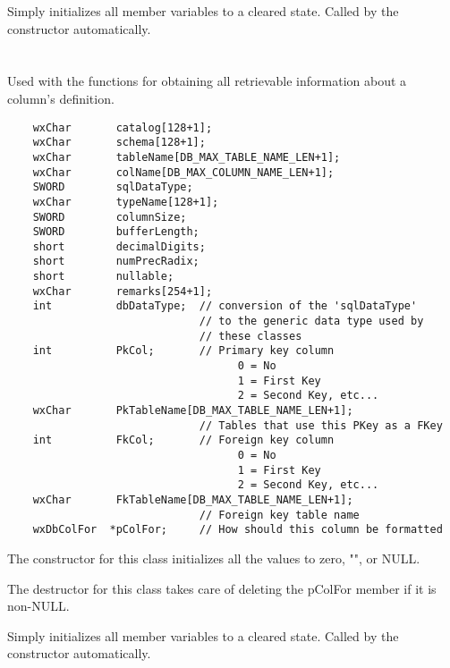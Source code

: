 \label{wxdbcolforinitialize}

Simply initializes all member variables to a cleared state.  Called by 
the constructor automatically.


\section{}\label{wxdbcolinf}

Used with the  functions for obtaining all retrievable information about a column's definition.

\begin{verbatim}
    wxChar       catalog[128+1];
    wxChar       schema[128+1];
    wxChar       tableName[DB_MAX_TABLE_NAME_LEN+1];
    wxChar       colName[DB_MAX_COLUMN_NAME_LEN+1];
    SWORD        sqlDataType;
    wxChar       typeName[128+1];
    SWORD        columnSize;
    SWORD        bufferLength;
    short        decimalDigits;
    short        numPrecRadix;
    short        nullable;
    wxChar       remarks[254+1];
    int          dbDataType;  // conversion of the 'sqlDataType' 
                              // to the generic data type used by 
                              // these classes
    int          PkCol;       // Primary key column
                                    0 = No
                                    1 = First Key
                                    2 = Second Key, etc...
    wxChar       PkTableName[DB_MAX_TABLE_NAME_LEN+1];
                              // Tables that use this PKey as a FKey
    int          FkCol;       // Foreign key column
                                    0 = No
                                    1 = First Key
                                    2 = Second Key, etc...
    wxChar       FkTableName[DB_MAX_TABLE_NAME_LEN+1]; 
                              // Foreign key table name
    wxDbColFor  *pColFor;     // How should this column be formatted
\end{verbatim}

The constructor for this class initializes all the values to zero, "", or NULL.

The destructor for this class takes care of deleting the pColFor member if 
it is non-NULL.


\label{wxdbcolinfinitialize}

Simply initializes all member variables to a cleared state.  Called by 
the constructor automatically.



